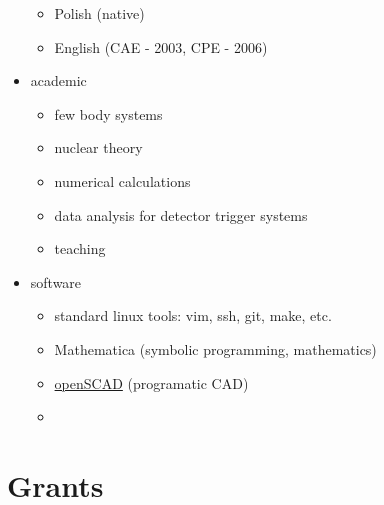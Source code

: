 \documentclass{article}
\providecommand{\tightlist}{%
  \setlength{\itemsep}{0pt}\setlength{\parskip}{0pt}}
\begin{document}
\begin{itemize}
  \begin{itemize}
  \tightlist
  \item
    Polish (native)
  \item
    English (CAE - 2003, CPE - 2006)
  \end{itemize}
\item
  academic

  \begin{itemize}
  \tightlist
  \item
    few body systems
  \item
    nuclear theory
  \item
    numerical calculations
  \item
    data analysis for detector trigger systems
  \item
    teaching
  \end{itemize}
\item
  software

  \begin{itemize}
  \tightlist
  \item
    standard linux tools: vim, ssh, git, make, etc.
  \item
    Mathematica (symbolic programming, mathematics)
  \item
    \href{https://openscad.org/}{openSCAD} (programatic CAD)
  \item
  \end{itemize}
\end{itemize}

\hypertarget{grants}{%
\section{Grants}\label{grants}}
\end{document}
